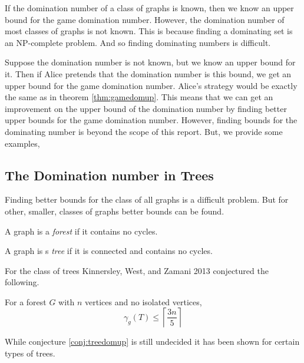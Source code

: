 If the domination number of a class of graphs is known, then we know an upper bound for the game domination number. However, the domination number of most classes of graphs is not known. This is because finding a dominating set is an NP-complete problem. And so finding dominating numbers is difficult.

Suppose the domination number is not known, but we know an upper bound for it. Then if Alice pretends that the domination number is this bound, we get an upper bound for the game domination number. Alice's strategy would be exactly the same as in theorem \ref{thm:gamedomup}. This means that we can get an improvement on the upper bound of the domination number by finding  better upper bounds for the game domination number. However, finding bounds for the dominating number is beyond the scope of this report. But, we provide some examples,


\subsection{The Domination number in Trees}
Finding better bounds for the class of all graphs is a difficult problem. But for other, smaller, classes of graphs better bounds can be found. 
\begin{definition}[Forest]
    A graph is a \textit{forest} if it contains no cycles. 
\end{definition}
\begin{definition}[Tree]
    A graph is s \textit{tree} if it is connected and contains no cycles.
\end{definition}
For the class of trees Kinnersley, West, and Zamani 2013 \cite{KiWeZa2013} conjectured the following. 
\begin{conjecture} \label{conj:treedomup}
    For a forest $G$ with $n$ vertices and no isolated vertices,    
    \[ \gamma_g(T) \leq \left\lceil \frac{3n}{5} \right\rceil\]
\end{conjecture}
While conjecture \ref{conj:treedomup} is still undecided it has been shown for certain types of trees. 

